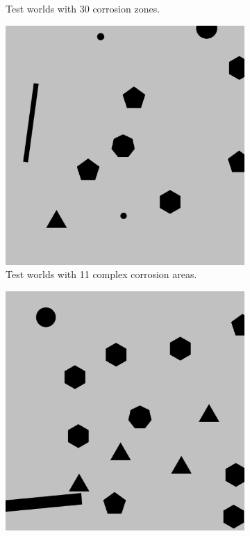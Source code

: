 \begin{theappendices}
\begin{figure}[H]
\begin{subfigure}[t]{0.15\linewidth}
				\caption{Test worlds with 30 corrosion zones.}
				\label{fig:test_model_30_1}
			\end{subfigure}
			\hfill
			\begin{subfigure}[t]{0.15\linewidth}
				\includegraphics[width=\linewidth]{graphics/test_model_11_complex_1.png}
				\caption{Test worlds with 11 complex corrosion areas.}
				\label{fig:test_model_11_complex_1}
			\end{subfigure}
			\hfill
			\begin{subfigure}[t]{0.15\linewidth}
				\centering
				\includegraphics[width=\linewidth]{graphics/test_model_15_complex_1.png}

\end{subfigure}
\end{figure}
\end{theappendices}

